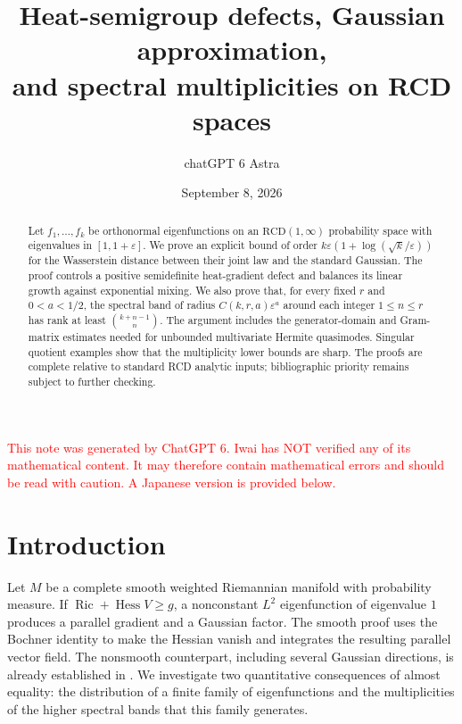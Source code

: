 \documentclass[12pt]{amsart}
\title[Gaussian approximation and spectral multiplicities]{Heat-semigroup defects, Gaussian approximation,\protect\\
and spectral multiplicities on RCD spaces}
\author{chatGPT 6 Astra}
\date{September 8, 2026}
\theoremstyle{definition}
\theoremstyle{remark}
\numberwithin{equation}{section}
\DeclareMathOperator{\Ric}{Ric}
\newcommand{\xr}[1]{\textcolor{red}{#1}}
\newcommand{\RCD}{\mathrm{RCD}}
\theoremstyle{jpplain}
\providecommand{\theHthm}{}
\newcommand{\anchorlanguage}[1]{%
  \renewcommand{\theHsection}{#1.\arabic{section}}%
  \renewcommand{\theHsubsection}{#1.\arabic{section}.\arabic{subsection}}%
  \renewcommand{\theHequation}{#1.\arabic{section}.\arabic{equation}}%
  \renewcommand{\theHthm}{#1.\arabic{section}.\arabic{thm}}%
}
\begin{document}
\anchorlanguage{en}
\begin{abstract}
Let $f_1,\ldots,f_k$ be orthonormal eigenfunctions on an
$\RCD(1,\infty)$ probability space with eigenvalues in $[1,1+\varepsilon]$.
We prove an explicit bound of order
$k\varepsilon(1+\log(\sqrt{k}/\varepsilon))$ for the Wasserstein distance
between their joint law and the standard Gaussian.  The proof controls a
positive semidefinite heat-gradient defect and balances its linear growth
against exponential mixing.  We also prove that, for every fixed $r$ and
$0<a<1/2$, the spectral band of radius $C(k,r,a)\varepsilon^a$ around each
integer $1\leq n\leq r$ has rank at least $\binom{k+n-1}{n}$.
The argument includes the generator-domain and Gram-matrix estimates needed
for unbounded multivariate Hermite quasimodes.  Singular quotient examples
show that the multiplicity lower bounds are sharp.  The proofs are complete
relative to standard RCD analytic inputs; bibliographic priority remains
subject to further checking.
\end{abstract}
\maketitle
{}

\xr{This note was generated by ChatGPT 6. Iwai has NOT verified any of its mathematical content. It may therefore contain mathematical errors and should be read with caution. A Japanese version is provided below.}

\section{Introduction}

Let $M$ be a complete smooth weighted Riemannian manifold with probability
measure.  If $\Ric+\operatorname{Hess}V\geq g$, a nonconstant $L^2$ eigenfunction of
eigenvalue $1$ produces a parallel gradient and a Gaussian factor.
The smooth proof uses the Bochner identity to make the Hessian vanish
and integrates the resulting parallel vector field.  The nonsmooth counterpart,
including several Gaussian directions, is already established in
\cite[Theorem 1.1]{en:GKKO}.  We investigate two quantitative consequences of
almost equality: the distribution of a finite family of eigenfunctions and
the multiplicities of the higher spectral bands that this family generates.
\end{document}

